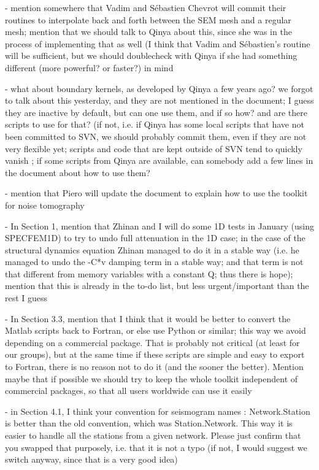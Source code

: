 \documentclass[11pt]{article}
\begin{document}
- mention somewhere that Vadim and Sébastien Chevrot will commit their routines to interpolate back and forth between the SEM mesh and a regular mesh; mention that we should talk to Qinya about this, since she was in the process of implementing that as well (I think that Vadim and Sébastien's routine will be sufficient, but we should doublecheck with Qinya if she had something different (more powerful? or faster?) in mind

- what about boundary kernels, as developed by Qinya a few years ago?
we forgot to talk about this yesterday, and they are not mentioned in the document; I guess they are inactive by default, but can one use them, and if so how? and are there scripts to use for that?
(if not, i.e. if Qinya has some local scripts that have not been committed to SVN, we should probably commit them, even if they are not very flexible yet; scripts and code that are kept outside of SVN tend to quickly vanish ; if some scripts from Qinya are available, can somebody add a few lines in the document about how to use them?

- mention that Piero will update the document to explain how to use the toolkit for noise tomography

- In Section 1, mention that Zhinan and I will do some 1D tests in January (using SPECFEM1D) to try to undo full attenuation in the 1D case; in the case of the structural dynamics equation Zhinan managed to do it in a stable way (i.e. he managed to undo the -C*v damping term in a stable way; and that term is not that different from memory variables with a constant Q; thus there is hope); mention that this is already in the to-do list, but less urgent/important than the rest I guess

- In Section 3.3, mention that I think that it would be better to convert the Matlab scripts back to Fortran, or else use Python or similar; this way we avoid depending on a commercial package. That is probably not critical (at least for our groups), but at the same time if these scripts are simple and easy to export to Fortran, there is no reason not to do it (and the sooner the better). Mention maybe that if possible we should try to keep the whole toolkit independent of commercial packages, so that all users worldwide can use it easily

- in Section 4.1, I think your convention for seismogram names : Network.Station is better than the old convention, which was Station.Network. This way it is easier to handle all the stations from a given network. Please just confirm that you swapped that purposely, i.e. that it is not a typo (if not, I would suggest we switch anyway, since that is a very good idea)
\end{document}
